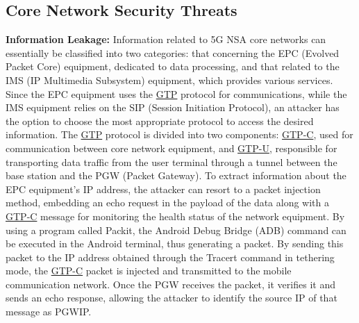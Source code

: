 \documentclass[english]{article}
\begin{document}
\subsection{Core Network Security Threats}
\textbf{Information Leakage:} Information related to 5G NSA core networks can essentially
be classified into two categories: that concerning the EPC (Evolved Packet Core) equipment,
dedicated to data processing, and that related to the IMS (IP Multimedia Subsystem) equipment,
which provides various services. Since the EPC equipment uses the \hyperlink{GTP}{GTP} protocol
for communications, while the IMS equipment relies on the SIP (Session Initiation Protocol),
an attacker has the option to choose the most appropriate protocol to access the desired information.
The \hyperlink{GTP}{GTP} protocol is divided into two components: \hyperlink{GTP}{GTP-C},
used for communication between core network equipment, and \hyperlink{GTP}{GTP-U}, responsible for
transporting data traffic from the user terminal through a tunnel between the base station and the
PGW (Packet Gateway). To extract information about the EPC equipment's IP address, the attacker
can resort to a packet injection method, embedding an echo request in the payload of the data
along with a \hyperlink{GTP}{GTP-C} message for monitoring the health status of the network equipment.
By using a program called Packit, the Android Debug Bridge (ADB) command can be executed in the
Android terminal, thus generating a packet. By sending this packet to the IP address obtained
through the Tracert command in tethering mode, the \hyperlink{GTP}{GTP-C} packet is injected and
transmitted to the mobile communication network. Once the PGW receives the packet, it verifies it
and sends an echo response, allowing the attacker to identify the source IP of that message as PGWIP.\@
\\[0.2cm]
\end{document}
